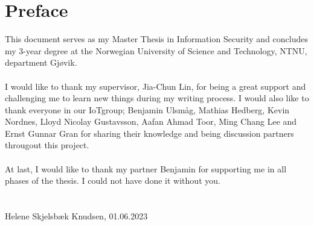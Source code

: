 \chapter*{Preface}
This document serves as my Master Thesis in Information Security and concludes my 3-year degree at the Norwegian University of Science and Technology, NTNU, department Gjøvik.
\\\\
I would like to thank my supervisor, Jia-Chun Lin, for being a great support and challenging me to learn new things during my writing process. I would also like to thank everyone in our \gls{IoT}group; Benjamin Ulsmåg, Mathias Hedberg, Kevin Nordnes, Lloyd Nicolay Gustavsson, Aafan Ahmad Toor, Ming Chang Lee and Ernst Gunnar Gran for sharing their knowledge and being discussion partners througout this project. 
\\\\
At last, I would like to thank my partner Benjamin for supporting me in all phases of the thesis. I could not have done it without you. 
\\\\\\
Helene Skjelsbæk Knudsen, 01.06.2023

